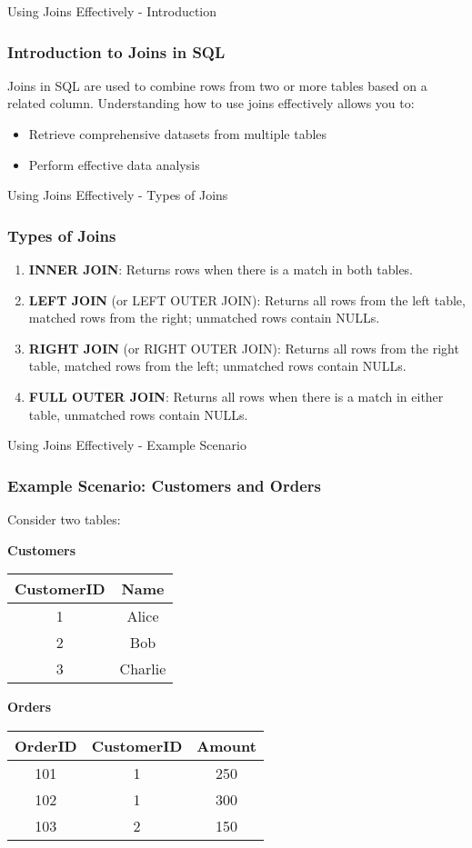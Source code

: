 \documentclass[aspectratio=169]{beamer}
\begin{document}
\begin{frame}[fragile]{Using Joins Effectively - Introduction}
    \frametitle{Introduction to Joins in SQL}
    Joins in SQL are used to combine rows from two or more tables based on a related column. 
    Understanding how to use joins effectively allows you to:
    \begin{itemize}
        \item Retrieve comprehensive datasets from multiple tables
        \item Perform effective data analysis
    \end{itemize}
\end{frame}

\begin{frame}[fragile]{Using Joins Effectively - Types of Joins}
    \frametitle{Types of Joins}
    \begin{enumerate}
        \item \textbf{INNER JOIN}: Returns rows when there is a match in both tables.
        \item \textbf{LEFT JOIN} (or LEFT OUTER JOIN): 
        Returns all rows from the left table, matched rows from the right; unmatched rows contain NULLs.
        \item \textbf{RIGHT JOIN} (or RIGHT OUTER JOIN): 
        Returns all rows from the right table, matched rows from the left; unmatched rows contain NULLs.
        \item \textbf{FULL OUTER JOIN}: 
        Returns all rows when there is a match in either table, unmatched rows contain NULLs.
    \end{enumerate}
\end{frame}

\begin{frame}[fragile]{Using Joins Effectively - Example Scenario}
    \frametitle{Example Scenario: Customers and Orders}
    Consider two tables:
    
    \textbf{Customers}
    \begin{center}
        \begin{tabular}{|c|c|}
            \hline
            CustomerID & Name \\
            \hline
            1 & Alice \\
            2 & Bob \\
            3 & Charlie \\
            \hline
        \end{tabular}
    \end{center}
    
    \textbf{Orders}
    \begin{center}
        \begin{tabular}{|c|c|c|}
            \hline
            OrderID & CustomerID & Amount \\
            \hline
            101 & 1 & 250 \\
            102 & 1 & 300 \\
            103 & 2 & 150 \\
            \hline
        \end{tabular}
    \end{center}
\end{frame}
\end{document}
